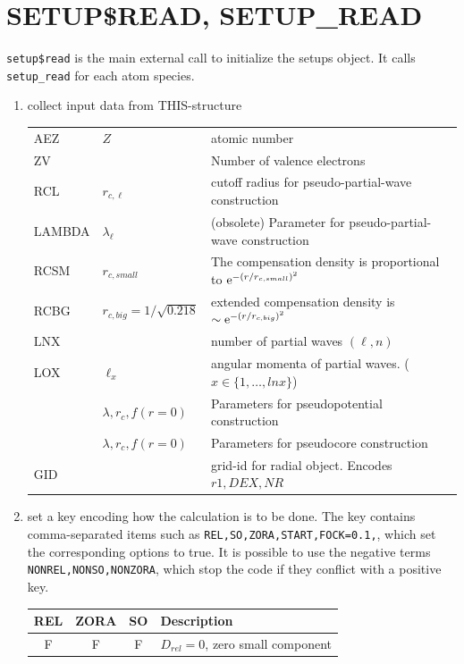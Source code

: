 \documentclass[11pt,a4paper]{report}
\begin{document}
\section{SETUP\$READ, SETUP\_READ}
\verb|setup$read| is the main
external call to initialize the setups object. It calls
\verb|setup_read| for each atom species.


\begin{enumerate}
\item collect input data from THIS-structure\\
\begin{tabular}{|l|l|l|}
\hline
AEZ  & $Z$ & atomic number\\
ZV   &     & Number of valence electrons\\
RCL  & $r_{c,\ell}$ & cutoff radius for pseudo-partial-wave
  construction\\
LAMBDA  & $\lambda_\ell$ & (obsolete) Parameter for pseudo-partial-wave
  construction\\
RCSM & $r_{c,small}$ & The compensation density is proportional to
  $\mathrm{e}^{-(r/r_{c,small})^2}$\\
RCBG & $r_{c,big}=1/\sqrt{0.218}$ & extended compensation density is
  $\sim\mathrm{e}^{-(r/r_{c,big})^2}$ \\
LNX & & number of partial waves $(\ell,n)$ \\
LOX & $\ell_x$ &  angular momenta of partial waves. ($x\in\{1,\ldots,lnx\}$)\\
    &$\lambda,r_c,f(r=0)$ &Parameters for pseudopotential construction \\
    & $\lambda,r_c,f(r=0)$& Parameters for pseudocore construction \\
GID & & grid-id for radial object. Encodes $r1,DEX,NR$\\
\hline
\end{tabular}
%
\item set a key encoding how the calculation is to be done.  The key
  contains comma-separated items such as
  \verb|REL,SO,ZORA,START,FOCK=0.1,|, which set the corresponding
  options to true. It is possible to use the negative terms
  \verb|NONREL,NONSO,NONZORA|, which stop the code if they conflict
  with a positive key.
\begin{center}
\begin{tabular}{|c|c|c|l|}
\hline
REL & ZORA & SO & Description\\
\hline
F & F & F & $D_{rel}=0$, zero small component\\

\end{tabular}
\end{center}
\end{enumerate}
\end{document}
